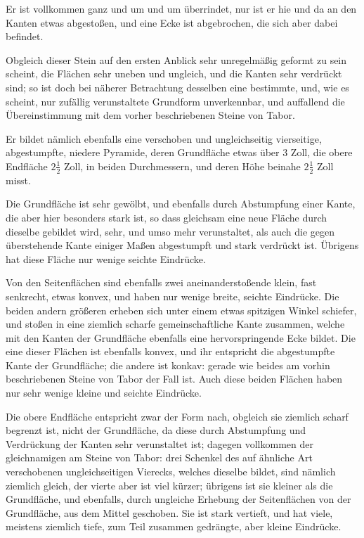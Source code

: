\documentclass[a4paper, 11pt, oneside, german]{article}
\begin{document}
Er ist vollkommen ganz und um und um überrindet, nur ist er hie und da an den Kanten etwas abgestoßen, und eine Ecke ist abgebrochen, die sich aber dabei befindet.

Obgleich dieser Stein auf den ersten Anblick sehr unregelmäßig geformt zu sein scheint, die Flächen sehr uneben und ungleich, und die Kanten sehr verdrückt sind; so ist doch bei näherer Betrachtung desselben eine bestimmte, und, wie es scheint, nur zufällig verunstaltete Grundform unverkennbar, und auffallend die Übereinstimmung mit dem vorher beschriebenen Steine von Tabor.

Er bildet nämlich ebenfalls eine verschoben und ungleichseitig vierseitige, abgestumpfte, niedere Pyramide, deren Grundfläche etwas über 3 Zoll, die obere Endfläche $2\frac{1}{2}$ Zoll, in beiden Durchmessern, und deren Höhe beinahe $2\frac{1}{2}$ Zoll misst.

Die Grundfläche ist sehr gewölbt, und ebenfalls durch Abstumpfung einer Kante, die aber hier besonders stark ist, so dass gleichsam eine neue Fläche durch dieselbe gebildet wird, sehr, und umso mehr verunstaltet, als auch die gegen überstehende Kante einiger Maßen abgestumpft und stark verdrückt ist. Übrigens hat diese Fläche nur wenige seichte Eindrücke.

Von den Seitenflächen sind ebenfalls zwei aneinanderstoßende klein, fast senkrecht, etwas konvex, und haben nur wenige breite, seichte Eindrücke. Die beiden andern größeren erheben sich unter einem etwas spitzigen Winkel schiefer, und stoßen in eine ziemlich scharfe gemeinschaftliche Kante zusammen, welche mit den Kanten der Grundfläche ebenfalls eine hervorspringende Ecke bildet. Die eine dieser Flächen ist ebenfalls konvex, und ihr entspricht die abgestumpfte Kante der Grundfläche; die andere ist konkav: gerade wie beides am vorhin beschriebenen Steine von Tabor der Fall ist. Auch diese beiden Flächen haben nur sehr wenige kleine und seichte Eindrücke.

Die obere Endfläche entspricht zwar der Form nach, obgleich sie ziemlich scharf begrenzt ist, nicht der Grundfläche, da diese durch Abstumpfung und Verdrückung der Kanten sehr verunstaltet ist; dagegen vollkommen der gleichnamigen am Steine von Tabor: drei Schenkel des auf ähnliche Art verschobenen ungleichseitigen Vierecks, welches dieselbe bildet, sind nämlich ziemlich gleich, der vierte aber ist viel kürzer; übrigens ist sie kleiner als die Grundfläche, und ebenfalls, durch ungleiche Erhebung der Seitenflächen von der Grundfläche, aus dem Mittel geschoben. Sie ist stark vertieft, und hat viele, meistens ziemlich tiefe, zum Teil zusammen gedrängte, aber kleine Eindrücke.
\end{document}
